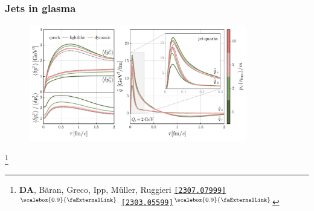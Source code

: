 \documentclass[aspectratio=169,11pt,usenames,dvipsnames]{beamer}
\renewcommand{\thefootnote}{\color{customblue}\faPaperPlaneO}
\newcommand\blfootnote[1]{%
  \begingroup
  \renewcommand\thefootnote{}\footnote{#1}%
  \addtocounter{footnote}{-1}%
  \endgroup
}
\begin{document}



\begin{frame}
    \frametitle{Jets in glasma}
    \begin{center}
        \begin{figure}
            \centering
            \includegraphics[width=0.85\textwidth]{images/hp23_mom_broad_qhat_anis_wong_vs_qhat.pdf}
        \end{figure}
    \end{center}
    \vspace{-20pt}
    \blfootnote{\scriptsize \textbf{DA}, Băran, Greco, Ipp, Müller, Ruggieri  \href{https://arxiv.org/abs/2307.07999}{{\color{custompink}\texttt{[2307.07999]}$^\text{\scalebox{0.9}{\faExternalLink}}$}} \href{https://arxiv.org/abs/2303.05599}{\color{palgold}\texttt{[2303.05599]}$^\text{\scalebox{0.9}{\faExternalLink}}$}}
\end{frame}
\end{document}
